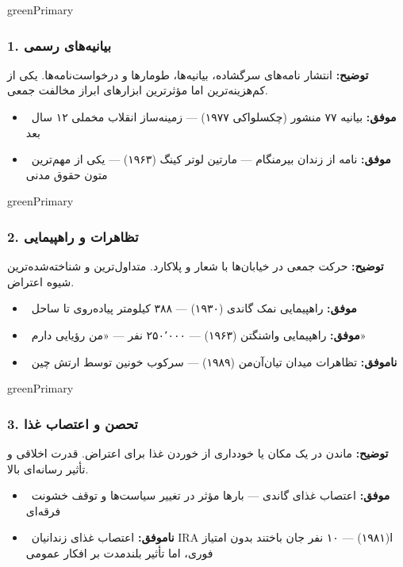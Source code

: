\documentclass[a4paper,12pt]{article}
\newcommand{\success}[1]{\textcolor{greenPrimary}{\faCheckCircle\ \textbf{موفق:}} #1}
\newcommand{\failure}[1]{\textcolor{redPrimary}{\faTimesCircle\ \textbf{ناموفق:}} #1}
\newcommand{\methodnum}[1]{\textcolor{purpleLight}{\textbf{#1.}}}
\begin{document}
\begin{methodcard}{greenPrimary}
\subsubsection{\methodnum{1} بیانیه‌های رسمی}
\textbf{توضیح:} انتشار نامه‌های سرگشاده، بیانیه‌ها، طومارها و درخواست‌نامه‌ها. یکی از کم‌هزینه‌ترین اما مؤثرترین ابزارهای ابراز مخالفت جمعی.

\begin{itemize}[label=\textcolor{greenPrimary}{\faCheckCircle}]
  \item \success{بیانیه ۷۷ منشور (چکسلواکی ۱۹۷۷) — زمینه‌ساز انقلاب مخملی ۱۲ سال بعد}
  \item \success{نامه از زندان بیرمنگام — مارتین لوتر کینگ (۱۹۶۳) — یکی از مهم‌ترین متون حقوق مدنی}
\end{itemize}
\end{methodcard}

\begin{methodcard}{greenPrimary}
\subsubsection{\methodnum{2} تظاهرات و راهپیمایی}
\textbf{توضیح:} حرکت جمعی در خیابان‌ها با شعار و پلاکارد. متداول‌ترین و شناخته‌شده‌ترین شیوه اعتراض.

\begin{itemize}[label=\textcolor{greenPrimary}{\faCheckCircle}]
  \item \success{راهپیمایی نمک گاندی (۱۹۳۰) — ۳۸۸ کیلومتر پیاده‌روی تا ساحل}
  \item \success{راهپیمایی واشنگتن (۱۹۶۳) — ۲۵۰٬۰۰۰ نفر — «من رؤیایی دارم»}
\end{itemize}
\begin{itemize}[label=\textcolor{redPrimary}{\faTimesCircle}]
  \item \failure{تظاهرات میدان تیان‌آن‌من (۱۹۸۹) — سرکوب خونین توسط ارتش چین}
\end{itemize}
\end{methodcard}

\begin{methodcard}{greenPrimary}
\subsubsection{\methodnum{3} تحصن و اعتصاب غذا}
\textbf{توضیح:} ماندن در یک مکان یا خودداری از خوردن غذا برای اعتراض. قدرت اخلاقی و تأثیر رسانه‌ای بالا.

\begin{itemize}[label=\textcolor{greenPrimary}{\faCheckCircle}]
  \item \success{اعتصاب غذای گاندی — بارها مؤثر در تغییر سیاست‌ها و توقف خشونت فرقه‌ای}
\end{itemize}
\begin{itemize}[label=\textcolor{redPrimary}{\faTimesCircle}]
  \item \failure{اعتصاب غذای زندانیان IRA ا(۱۹۸۱) — ۱۰ نفر جان باختند بدون امتیاز فوری، اما تأثیر بلندمدت بر افکار عمومی}
\end{itemize}
\end{methodcard}
\end{document}
